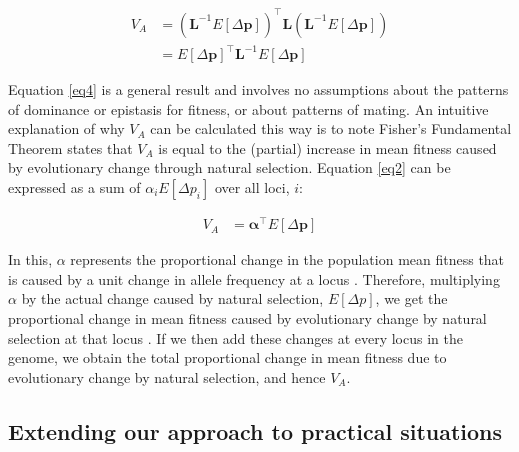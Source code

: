 \documentclass[12pt]{article}
\providecommand{\DIFaddtex}[1]{{\protect\color{blue}\uwave{#1}}} %
\providecommand{\DIFaddbegin}{} %
\providecommand{\DIFaddend}{} %
\providecommand{\DIFadd}[1]{\texorpdfstring{\DIFaddtex{#1}}{#1}} %
\newcommand{\DIFaddincludegraphics}[2][]{{\color{blue}\fbox{\DIFOincludegraphics[#1]{#2}}}} %
\DeclareRobustCommand{\DIFaddbegin}{\DIFOaddbegin \let\includegraphics\DIFaddincludegraphics} %
\DeclareRobustCommand{\DIFaddend}{\DIFOaddend \let\includegraphics\DIFOincludegraphics} %
\begin{document}
\begin{bibunit}
\begin{equation} \label{eq4}
\begin{array}{rl}
{V_A} &= \left({\textbf{L}^{-1}E[\Delta{\textbf{p}}]}\right)^{\top}{\textbf{L}}\left({\textbf{L}^{-1}E[\Delta{\textbf{p}}]}\right)\\
&= E[\Delta{\textbf{p}}]^{\top}{\textbf{L}^{-1}}E[\Delta{\textbf{p}}]
\end{array}
\end{equation}

Equation \ref{eq4} is a general result and involves no assumptions about the patterns of dominance or epistasis for fitness, or about patterns of mating. An intuitive explanation of why $V_A$ can be calculated this way is to note Fisher's Fundamental Theorem states that ${V_A}$ is equal to the (partial) increase in mean fitness caused by evolutionary change through natural selection. Equation \ref{eq2} can be expressed as a sum of $\alpha_i E[\Delta p_i]$ over all loci, $i$:

\begin{equation} \label{eq2b}
\begin{array}{rl}
{V_A} &= \boldsymbol{\alpha}^{\top}E[\Delta{\textbf{p}}]
\end{array}
\end{equation}

In this,  $\alpha$ represents the proportional change in the population mean fitness that is caused by a unit change in allele frequency at a locus \citep{Fisher.1941, Kojima.1959, Lee.2013}. Therefore, multiplying $\alpha$ by the actual change caused by natural selection, $E[\Delta p]$, we get the proportional change in mean fitness caused by evolutionary change by natural selection at that locus \DIFaddbegin \DIFadd{\mbox{%
\citep[see Eq 51.4][also]{price1972fisher}}\hskip0pt%
}\DIFaddend . If we then add these changes at every locus in the genome, we obtain the total proportional change in mean fitness due to evolutionary change by natural selection, and hence $V_A$.  

\subsection*{Extending our approach to practical situations}



\end{bibunit}
\end{document}
